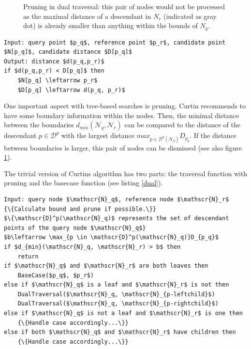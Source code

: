 \documentclass{utue} %
\begin{document}
\begin{figure}
	\caption{Pruning in dual traversal: this pair of nodes would not be processed as the maximal distance of a descendant in $N_r$ (indicated as gray dot) is already smaller than anything within the bounds of $N_q$.}
	\label{fig:pruning}
\end{figure}
\begin{lstlisting}[caption={Simple \texttt{BaseCase()} for nearest neighbor search.},label=basecase]
Input: query point $p_q$, reference point $p_r$, candidate point $N[p_q]$, candidate distance $D[p_q]$
Output: distance $d(p_q,p_r)$
if $d(p_q,p_r) < D[p_q]$ then
	$N[p_q] \leftarrow p_r$
	$D[p_q] \leftarrow d(p_q, p_r)$
\end{lstlisting}
One important aspect with tree-based searches is pruning. Curtin recommends to have some boundary information within the nodes. Then, the minimal distance between the boundaries $d_{min}(\mathscr{N}_q,\mathscr{N}_r)$ can be compared to the distance of the descendant $p \in \mathscr{D}^p$ with the largest distance $max_{p \in \mathscr{D}^p(\mathscr{N}_q)}D_{p_q}$. If the distance between boundaries is larger, this pair of nodes can be dismissed (see also figure \ref{fig:pruning}).

The trivial version of Curtins algorithm has two parts: the traversal function with pruning and the basecase function (see listing \ref{dual}).
\begin{lstlisting}[caption={\texttt{DualTraversal}($\mathscr{N}_q,\mathscr{N}_r$)},label=dual]
Input: query node $\mathscr{N}_q$, reference node $\mathscr{N}_r$
{\{Calculate bound and prune if possible.\}}
$\{\mathscr{D}^p(\mathscr{N}_q)$ represents the set of descendant points of the query node $\mathscr{N}_q$}
$b\leftarrow \max_{p \in \mathscr{D}^p(\mathscr{N}_q)}D_{p_q}$
if $d_{min}(\mathscr{N}_q, \mathscr{N}_r) > b$ then
	return
if $\mathscr{N}_q$ and $\mathscr{N}_r$ are both leaves then
	BaseCase($p_q$, $p_r$)
else if $\mathscr{N}_q$ is a leaf and $\mathscr{N}_r$ is not then
	DualTraversal($\mathscr{N}_q, \mathscr{N}_{p-leftchild}$)
	DualTraversal($\mathscr{N}_q, \mathscr{N}_{p-rightchild}$)
else if $\mathscr{N}_q$ is not a leaf and $\mathscr{N}_r$ is one then
	{\{Handle case accordingly...\}}
else if both $\mathscr{N}_q$ and $\mathscr{N}_r$ have children then
	{\{Handle case accordingly...\}}
\end{lstlisting}
\end{document}
